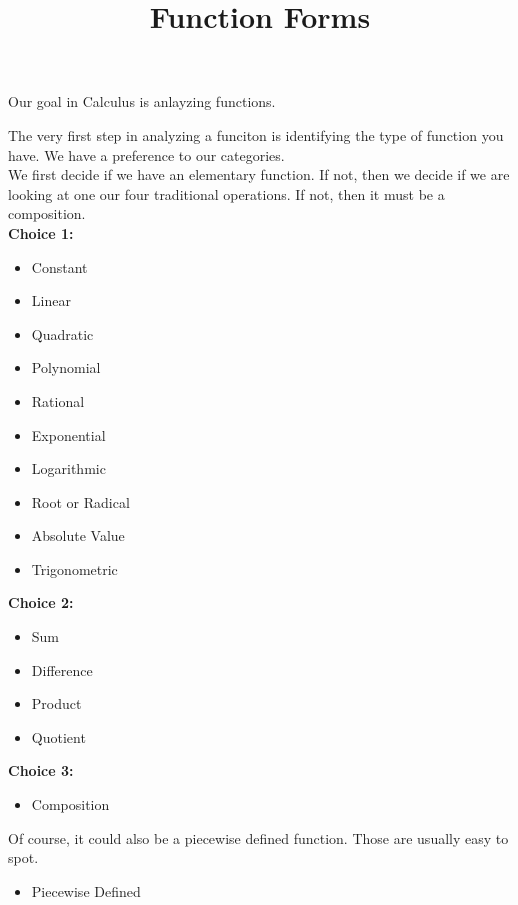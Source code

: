 \documentclass{ximera}
\title{Function Forms}
\begin{document}
\begin{abstract}
%
\end{abstract}
\maketitle



Our goal in Calculus is anlayzing functions.

The very first step in analyzing a funciton is identifying the type of function you have. We have a preference to our categories. \\

We first decide if we have an elementary function. If not, then we decide if we are looking at one our four traditional operations.  If not, then it must be a composition.\\



\textbf{\textcolor{blue!55!black}{Choice 1:}}
\begin{itemize}
\item Constant
\item Linear
\item Quadratic
\item Polynomial
\item Rational
\item Exponential
\item Logarithmic
\item Root or Radical
\item Absolute Value
\item Trigonometric
\end{itemize}



\textbf{\textcolor{blue!55!black}{Choice 2:}}
\begin{itemize}
\item Sum
\item Difference
\item Product
\item Quotient
\end{itemize}



\textbf{\textcolor{blue!55!black}{Choice 3:}}
\begin{itemize}
\item Composition
\end{itemize}




Of course, it could also be a piecewise defined function.  Those are usually easy to spot.
\begin{itemize}
\item Piecewise Defined
\end{itemize}
\end{document}
